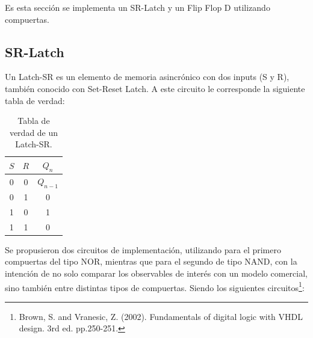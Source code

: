 Es esta sección se implementa un SR-Latch y un Flip Flop D utilizando compuertas.

\subsection{SR-Latch}

Un Latch-SR es un elemento de memoria asincrónico con dos inputs (S y R), también conocido con Set-Reset Latch. A este circuito le corresponde la siguiente tabla de verdad:
\begin{table}[H]
\centering
\begin{tabular}{cc|c}
\hline
\textbf{$S$} & \textbf{$R$} & \textbf{$Q_n$} \\ \hline
0            & 0            & $Q_{n-1}$      \\
0            & 1            & 0              \\
1            & 0            & 1              \\
1            & 1            & 0              \\
\hline
\end{tabular}
\caption{Tabla de verdad de un Latch-SR.}
\end{table}

Se propusieron dos circuitos de implementación, utilizando para el primero compuertas del tipo NOR, mientras que para el segundo de tipo NAND, con la intención de no solo comparar los observables de interés con un modelo comercial, sino también entre distintas tipos de compuertas. Siendo los siguientes circuitos\footnote{Brown, S. and Vranesic, Z. (2002). Fundamentals of digital logic with VHDL design. 3rd ed. pp.250-251.}:


